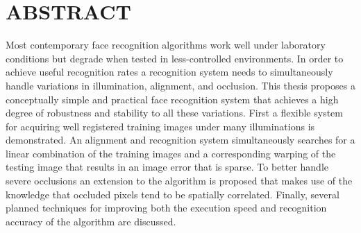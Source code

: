 \setcounter{page}{3}

\chapter*{ABSTRACT}
\doublespace



Most contemporary face recognition algorithms work well under laboratory conditions but degrade when tested in less-controlled environments. In order to achieve useful recognition rates a recognition system needs to simultaneously handle variations in illumination, alignment, and occlusion. This thesis proposes a conceptually simple and practical face recognition system that achieves a high degree of robustness and stability to all these variations.  First a flexible system for acquiring well registered training images under many illuminations is demonstrated.
An alignment and recognition system simultaneously searches for a linear combination of the training images and a corresponding warping of the testing image that results in an image error that is sparse.  To better handle severe occlusions an extension to the algorithm is proposed that makes use of the knowledge that occluded pixels tend to be spatially correlated.  Finally, several planned techniques for improving both the execution speed and recognition accuracy of the algorithm are discussed.

\newpage





\singlespace
%
\tableofcontents
\clearpage
%
\listoftables
\clearpage
%
\listoffigures

